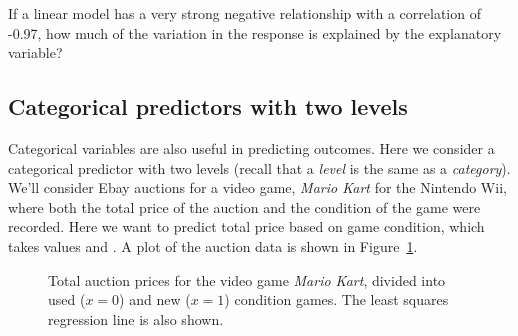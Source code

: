 \begin{exercisewrap}
\begin{nexercise}
If a linear model has a very strong negative relationship with
a correlation of -0.97, how much of the variation in the response
is explained by the explanatory variable?\footnotemark{}
\end{nexercise}
\end{exercisewrap}



\subsection{Categorical predictors with two levels}
\label{categoricalPredictorsWithTwoLevels}

Categorical variables are also useful in predicting outcomes.
Here we consider a categorical predictor with two levels
(recall that a \emph{level} is the same as a \emph{category}).
We'll consider Ebay auctions for a video game, \emph{Mario Kart}
for the Nintendo Wii, where both the total price of the auction
and the condition of the game were recorded.
Here we want to predict total price based on game condition,
which takes values  and .
A plot of the auction data is shown in Figure~\ref{marioKartNewUsed}.

\begin{figure}[h]
  \centering
  \caption{Total auction prices for the video game
      \emph{Mario Kart}, divided into used ($x=0$)
      and new ($x=1$) condition games.
      The least squares regression line is also shown.}
  \label{marioKartNewUsed}
\end{figure}

